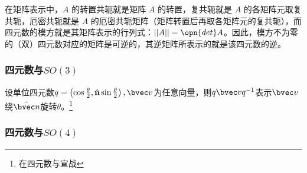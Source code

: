 在矩阵表示中，$A$ 的转置共轭就是矩阵 $A$ 的转置，复共轭就是 $A$ 的各矩阵元取复共轭，厄密共轭就是 $A$ 的厄密共轭矩阵（矩阵转置后再取各矩阵元的复共轭），而四元数的模方就是其矩阵表示的行列式：$||A||=\opn{det}A$。因此，模方不为零的（双）四元数对应的矩阵是可逆的，其逆矩阵所表示的就是该四元数的逆。
\subsubsection{四元数与$SO(3)$}
设单位四元数$q=\left(\cos\frac{\theta}{2},\hat{\mathbf{n}}\sin\frac{\theta}{2}\right),\bvec v$为任意向量，则$q\bvec vq^{-1}$表示$\bvec v$绕$\hat {\bvec n}$旋转$\theta$。\footnote{在四元数与宣战}

\subsubsection{四元数与$SO(4)$}